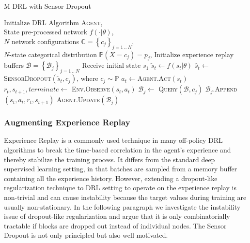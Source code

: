 \documentclass[../thesis.tex]{subfiles}
\begin{document}
\begin{algorithm}[t]
    \caption{M-DRL with Sensor Dropout}
    \label{alg:mdrl-algo}
\begin{algorithmic}
     Initialize DRL Algorithm \textsc{Agent},\\
    \qquad \quad State pre-processed network $f(\cdot|\theta)$, \\
    \qquad \quad $N$ network configurations $\mathbb{C}= \left\{c_j\right\}_{j=1~..~N}$,\\
    \qquad \quad $N$-state categorical distribution $\mathbb{P}(X=c_j) = p_j$,
    \State Initialize experience replay buffers $\mathcal{B} = \left\{\mathcal{B}_j\right\}_{j=1~..~N}$
     \State Receive initial state $s_1$
        \State $\tilde{s}_t \leftarrow f(s_t|\theta)$
        \State $\hat{s}_t \leftarrow$ \textsc{SensorDropout}$(\tilde{s}_t , c_j)$, where $c_j \sim \mathbb{P}$
        \State $a_t \leftarrow $\textsc{Agent.Act}$(\hat{s}_t)$ 
        \State $r_t,s_{t+1},terminate \leftarrow$ \textsc{Env.Observe}$(s_t, a_t)$ 
        \State $\mathcal{B}_j \leftarrow$ \textsc{Query}$(\mathcal{B},c_j)$
        \State $\mathcal{B}_j.$\textsc{Append}$(s_t, a_t, r_t, s_{t+1})$
        \State \textsc{Agent.Update}$(\mathcal{B}_j)$
     \EndFor
    \EndFor
\end{algorithmic}
\end{algorithm}

\subsubsection{Augmenting Experience Replay}
Experience Replay is a commonly used technique in many off-policy DRL algorithms to break the time-based correlation in the agent's experience and thereby stabilize the training process. It differs from the standard deep supervised learning setting, in that batches are sampled from a memory buffer containing all the experience history. However, extending a dropout-like regularization technique to DRL setting to operate on the experience replay is non-trivial and can cause instability because the target values during training are usually non-stationary. In the following paragraph we investigate the instability issue of dropout-like regularization and argue that it is only combinatorially tractable if blocks are dropped out instead of individual nodes. The Sensor Dropout is not only principled but also well-motivated.
\end{document}
